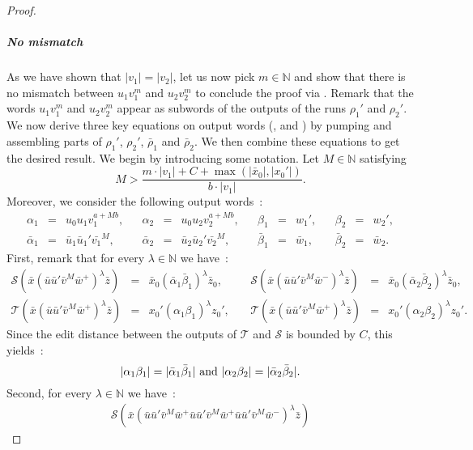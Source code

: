 \documentclass[a4paper,UKenglish,cleveref, autoref, thm-restate,authorcolumns, colorlinks]{lipics-v2021}
\newcommand{\trans}{\mathcal{T}}
\newcommand{\transs}{\mathcal{S}}
\begin{document}
\begin{proof}
\subparagraph*{No mismatch}
As we have shown that $|v_1| = |v_2|$, let us now pick $m \in \mathbb{N}$
and show that there is no mismatch
between $u_1v_1^m$ and  $u_2v_2^m$ to conclude the proof via .
Remark that the words $u_1v_1^m$
and $u_2v_2^m$ appear as subwords of the
outputs of the runs $\rho_1'$ and $\rho_2'$.
We now derive three key equations on output words
(,  and )
by pumping and assembling parts of $\rho_1'$, $\rho_2'$,
$\bar{\rho}_1$ and $\bar{\rho}_2$.
We then combine these equations to get the desired result.
We begin by introducing some notation. Let $M\in \mathbb{N}$ satisfying
\[
M > \frac{m \cdot |v_1| + C + \max(|\bar{x}_0|,|x_0'|)}{b \cdot |v_1|}.
\]
Moreover, we consider the following output words~:
\[  \begin{array}{lllllllllllllll}
    \alpha_1 & = & u_0u_1v_1^{a + Mb}, & &
    \alpha_2 & = & u_0u_2v_2^{a + Mb}, & &
    \beta_1 & = & w_1', &&
    \beta_2 & = & w_2',\\
    \bar{\alpha}_1 & = &\bar{u}_1\bar{u}_1'\bar{v_1}^M, & &
    \bar{\alpha}_2 & = & \bar{u}_2\bar{u}_2'\bar{v_2}^M, & &
    \bar{\beta}_1 & = & \bar{w}_1, &&
    \bar{\beta}_2 & = & \bar{w}_2.
    \end{array}
\]
First, remark that for every $\lambda \in \mathbb{N}$ we have~:
\[
\begin{array}{lllllll}
\transs(\bar{x}(\bar{u}\bar{u}'\bar{v}^M\bar{w}^+)^\lambda\bar{z})
& = & \bar{x}_0(\bar{\alpha}_1\bar{\beta}_1)^\lambda\bar{z}_0,
& \ &
\transs(\bar{x}(\bar{u}\bar{u}'\bar{v}^M\bar{w}^-)^\lambda\bar{z})
& = & \bar{x}_0(\bar{\alpha}_2\bar{\beta}_2)^\lambda\bar{z}_0,\\
\trans(\bar{x}(\bar{u}\bar{u}'\bar{v}^M\bar{w}^+)^\lambda\bar{z})
& = & x_0'(\alpha_1\beta_1)^\lambda z_0',
& \ &
\trans(\bar{x}(\bar{u}\bar{u}'\bar{v}^M\bar{w}^+)^\lambda\bar{z})
& = & x_0'(\alpha_2\beta_2)^\lambda z_0'.
\end{array}
\]
Since the edit distance between
the outputs of $\trans$ and $\transs$ is bounded by $C$, this yields~:
\begin{equation}\label{equ:loopSize}
    |\alpha_1 \beta_1| = |\bar{\alpha}_1 \bar{\beta}_1| \textup{ and } 
    |\alpha_2 \beta_2| = |\bar{\alpha}_2 \bar{\beta}_2|.
\end{equation}
Second, for every $\lambda \in \mathbb{N}$ we have~:
\[
\begin{array}{lllllll}
\transs(\bar{x}(\bar{u}\bar{u}'\bar{v}^M\bar{w}^+\bar{u}\bar{u}'\bar{v}^M\bar{w}^+\bar{u}\bar{u}'\bar{v}^M\bar{w}^-)^\lambda\bar{z})

\end{array}\]
\end{proof}
\end{document}
